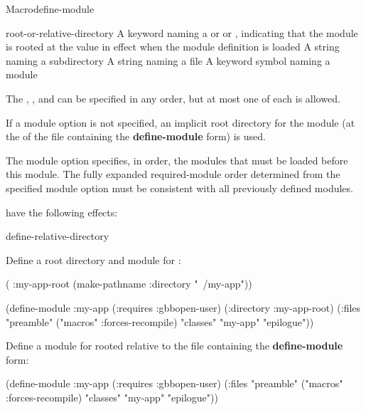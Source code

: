\documentclass[10pt,twoside,english,pdftex]{article}
\begin{document}
\begin{functiondoc}{Macro}{define-module}{\superstar}
\fnterms
\begin{args}{root-or-relative-directory}
 A keyword naming a  or
 or \nil{}, indicating that the module 
  is rooted at the  value in effect when the module
  definition is loaded
\arg[subdirectory] A string naming a subdirectory
 A string naming a file
 A keyword symbol naming a module 
\end{args}

\fndescription The  ,
, and  can be specified in any order,
but at most one of each is allowed.

If a  module option is not specified, an implicit
root directory for the module (at the  of the
file containing the \textbf{define-module} form) is used.

The  module option specifies, in order, the modules that must
be loaded before this module.  The fully expanded required-module order
determined from the specified  module option must be
consistent with all previously defined modules.

 have the following effects: \compilemodulefileoptions

\begin{alsos}{define-relative-directory}
\end{alsos}

\fnexamples
{}%
Define a root directory and module for :
\begin{example}
  ( :my-app-root 
    (make-pathname :directory "~/my-app"))

  (define-module :my-app
    (:requires :gbbopen-user)
    (:directory :my-app-root)
    (:files "preamble"
            ("macros" :forces-recompile)
            "classes"
            "my-app"
            "epilogue"))
\end{example}

Define a module for  rooted relative to the file 
containing the \textbf{define-module} form:
\begin{example}
  (define-module :my-app
    (:requires :gbbopen-user)
    (:files "preamble"
            ("macros" :forces-recompile)
            "classes"
            "my-app"
            "epilogue"))
\end{example}

\end{functiondoc}
\end{document}
